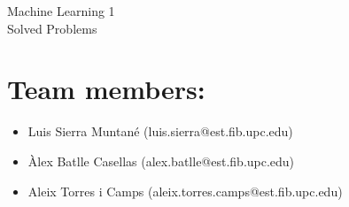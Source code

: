 \documentclass[10pt]{article}
\begin{document}
\begingroup
  \centering
  \Huge Machine Learning 1\\
  \vskip 0.5cm
  \LARGE Solved Problems\\[1.5em]
\endgroup

\section{Team members:}
\begin{itemize}
  \item Luis Sierra Muntané (luis.sierra@est.fib.upc.edu)
  \item Àlex Batlle Casellas (alex.batlle@est.fib.upc.edu)
  \item Aleix Torres i Camps (aleix.torres.camps@est.fib.upc.edu)
\end{itemize}
\vskip 0.3cm
\end{document}
